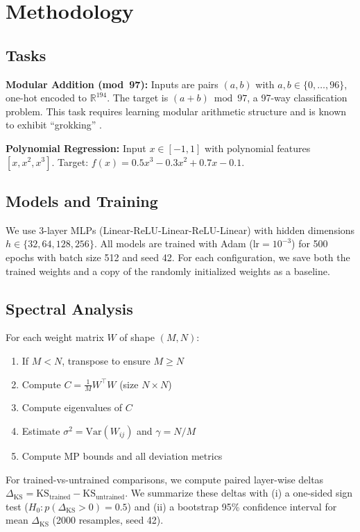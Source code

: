 \documentclass[11pt]{article}
\begin{document}
\section{Methodology}

\subsection{Tasks}

\textbf{Modular Addition (mod~97):} Inputs are pairs $(a, b)$ with $a, b \in \{0, \ldots, 96\}$, one-hot encoded to $\mathbb{R}^{194}$.
The target is $(a + b) \bmod 97$, a 97-way classification problem.
This task requires learning modular arithmetic structure and is known to exhibit ``grokking'' \cite{power2022grokking}.

\textbf{Polynomial Regression:} Input $x \in [-1, 1]$ with polynomial features $[x, x^2, x^3]$.
Target: $f(x) = 0.5x^3 - 0.3x^2 + 0.7x - 0.1$.

\subsection{Models and Training}

We use 3-layer MLPs (Linear-ReLU-Linear-ReLU-Linear) with hidden dimensions $h \in \{32, 64, 128, 256\}$.
All models are trained with Adam ($\text{lr}=10^{-3}$) for 500 epochs with batch size 512 and seed 42.
For each configuration, we save both the trained weights and a copy of the randomly initialized weights as a baseline.

\subsection{Spectral Analysis}

For each weight matrix $W$ of shape $(M, N)$:
\begin{enumerate}
    \item If $M < N$, transpose to ensure $M \geq N$
    \item Compute $C = \frac{1}{M} W^\top W$ (size $N \times N$)
    \item Compute eigenvalues of $C$
    \item Estimate $\sigma^2 = \text{Var}(W_{ij})$ and $\gamma = N/M$
    \item Compute MP bounds and all deviation metrics
\end{enumerate}

For trained-vs-untrained comparisons, we compute paired layer-wise deltas
$\Delta_{\mathrm{KS}} = \mathrm{KS}_{\mathrm{trained}} - \mathrm{KS}_{\mathrm{untrained}}$.
We summarize these deltas with (i) a one-sided sign test
($H_0: p(\Delta_{\mathrm{KS}}>0)=0.5$) and (ii) a bootstrap 95\% confidence
interval for mean $\Delta_{\mathrm{KS}}$ (2000 resamples, seed 42).
\end{document}
